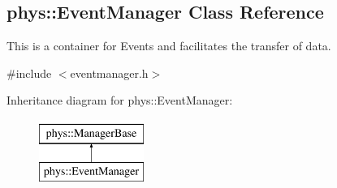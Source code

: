 \hypertarget{classphys_1_1EventManager}{
\subsection{phys::EventManager Class Reference}
\label{classphys_1_1EventManager}
}


This is a container for Events and facilitates the transfer of data.  




{\ttfamily \#include $<$eventmanager.h$>$}

Inheritance diagram for phys::EventManager:\begin{figure}[H]
\begin{center}
\leavevmode
\includegraphics[height=2.000000cm]{classphys_1_1EventManager}
\end{center}
\end{figure}
